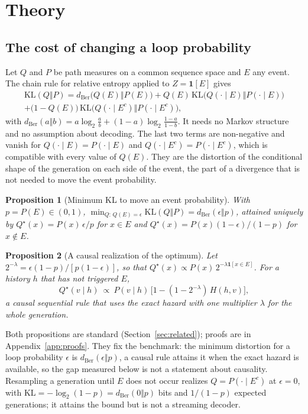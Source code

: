 \documentclass[make,article,submit,pdftex]{Definitions/mdpi}
\providecommand{\KL}{}\renewcommand{\KL}{\mathrm{KL}}
\newtheorem{prop}{Proposition}
\begin{document}
\section{Theory}\label{sec:theory}

\subsection{The cost of changing a loop probability}\label{ssec:bernoulli-bound}
Let $Q$ and $P$ be path measures on a common sequence space and $E$ any event. The chain rule for relative entropy applied to $Z=\mathbf{1}[E]$ gives
\begin{multline}\label{eq:decomp}
\KL(Q\Vert P)=d_{\mathrm{Ber}}\big(Q(E)\Vert P(E)\big)+Q(E)\,\KL\big(Q(\cdot\mid E)\Vert P(\cdot\mid E)\big)\\
+\big(1-Q(E)\big)\,\KL\big(Q(\cdot\mid E^c)\Vert P(\cdot\mid E^c)\big),
\end{multline}
with $d_{\mathrm{Ber}}(a\Vert b)=a\log_2\frac ab+(1-a)\log_2\frac{1-a}{1-b}$. It needs no Markov structure and no assumption about decoding. The last two terms are non-negative and vanish for $Q(\cdot\mid E)=P(\cdot\mid E)$ and $Q(\cdot\mid E^c)=P(\cdot\mid E^c)$, which is compatible with every value of $Q(E)$. They are the distortion of the conditional shape of the generation on each side of the event, the part of a divergence that is not needed to move the event probability.

\begin{prop}[Minimum KL to move an event probability]\label{prop:min}
With $p=P(E)\in(0,1)$, $\min_{Q:\,Q(E)=\epsilon}\KL(Q\Vert P)=d_{\mathrm{Ber}}(\epsilon\Vert p)$, attained uniquely by $Q^\star(x)=P(x)\,\epsilon/p$ for $x\in E$ and $Q^\star(x)=P(x)(1-\epsilon)/(1-p)$ for $x\notin E$.
\end{prop}

\begin{prop}[A causal realization of the optimum]\label{prop:causal}
Let $2^{-\lambda}=\epsilon(1-p)/[p(1-\epsilon)]$, so that $Q^\star(x)\propto P(x)\,2^{-\lambda\mathbf{1}[x\in E]}$. For a history $h$ that has not triggered $E$,
\[
Q^\star(v\mid h)\ \propto\ P(v\mid h)\,\big[1-(1-2^{-\lambda})\,H(h,v)\big],
\]
a causal sequential rule that uses the exact hazard with one multiplier $\lambda$ for the whole generation.
\end{prop}

Both propositions are standard (Section~\ref{sec:related}); proofs are in Appendix~\ref{app:proofs}. They fix the benchmark: the minimum distortion for a loop probability $\epsilon$ is $d_{\mathrm{Ber}}(\epsilon\Vert p)$, a causal rule attains it when the exact hazard is available, so the gap measured below is not a statement about causality. Resampling a generation until $E$ does not occur realizes $Q=P(\cdot\mid E^c)$ at $\epsilon=0$, with $\KL=-\log_2(1-p)=d_{\mathrm{Ber}}(0\Vert p)$ bits and $1/(1-p)$ expected generations; it attains the bound but is not a streaming decoder.
\end{document}
